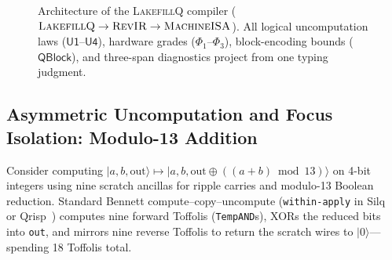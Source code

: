 \documentclass[acmsmall,screen,anonymous]{acmart}
\DeclareRobustCommand{\_}{\ifmmode\text{\char95}\else\char95\penalty0\relax\fi}
\theoremstyle{plain}
\newcommand{\LakefillQ}{\textsc{LakefillQ}}
\newcommand{\RevIR}{\textsc{RevIR}}
\newcommand{\MachineISA}{\textsc{MachineISA}}
\newcommand{\QPhysGrade}{\ensuremath{\mathsf{QPhysGrade}}}
\newcommand{\QBlock}{\ensuremath{\mathsf{QBlock}}}
\begin{document}
\begin{figure}[t]
{}
\caption{Architecture of the \LakefillQ{} compiler ($\LakefillQ{} \to \RevIR{} \to \MachineISA{}$). All logical uncomputation laws ($\mathsf{U1}$--$\mathsf{U4}$), hardware grades ($\Phi_1$--$\Phi_3$), block-encoding bounds ($\QBlock$), and three-span diagnostics project from one typing judgment.}
\label{fig:f15}
\end{figure}

\subsection{Asymmetric Uncomputation and Focus Isolation: Modulo-13 Addition}

Consider computing $|a, b, \mathrm{out}\rangle \mapsto |a, b, \mathrm{out} \oplus ((a + b) \bmod 13)\rangle$ on 4-bit integers using nine scratch ancillas for ripple carries and modulo-13 Boolean reduction. Standard Bennett compute--copy--uncompute (\texttt{within-apply} in Silq~\cite{bichsel2020} or Qrisp~\cite{seidel2024}) computes nine forward Toffolis (\texttt{TempAND}s), XORs the reduced bits into \texttt{out}, and mirrors nine reverse Toffolis to return the scratch wires to $|0\rangle$---spending 18 Toffolis total.
\end{document}
